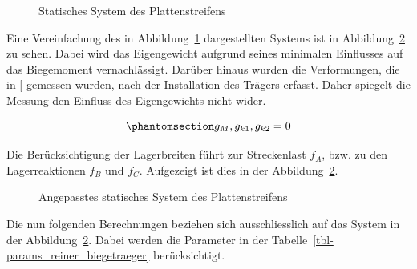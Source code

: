 \documentclass[
  12pt,
  letterpaper,
  egregdoesnotlikesansseriftitles]{scrreprt}
\begin{document}
\begin{figure}[H]


\caption{\label{fig-system_2}Statisches System des Plattenstreifens}

\end{figure}%

Eine Vereinfachung des in Abbildung~\ref{fig-system_2} dargestellten
Systems ist in Abbildung~\ref{fig-system_2_lager} zu sehen. Dabei wird
das Eigengewicht aufgrund seines minimalen Einflusses auf das
Biegemoment vernachlässigt. Darüber hinaus wurden die Verformungen, die
in {[}\citeproc{ref-Jaeger2006}{1}{]} gemessen wurden, nach der
Installation des Trägers erfasst. Daher spiegelt die Messung den
Einfluss des Eigengewichts nicht wider.

\begin{equation}\phantomsection\label{eq-eigengewicht}{
g_M, g_{k1}, g_{k2} = 0
}\end{equation}

Die Berücksichtigung der Lagerbreiten führt zur Streckenlast \(f_A\),
bzw. zu den Lagerreaktionen \(f_B\) und \(f_C\). Aufgezeigt ist dies in
der Abbildung~\ref{fig-system_2_lager}.

\begin{figure}[H]


\caption{\label{fig-system_2_lager}Angepasstes statisches System des
Plattenstreifens}

\end{figure}%

Die nun folgenden Berechnungen beziehen sich ausschliesslich auf das
System in der Abbildung~\ref{fig-system_2_lager}. Dabei werden die
Parameter in der Tabelle~\ref{tbl-params_reiner_biegetraeger}
berücksichtigt.
\end{document}

